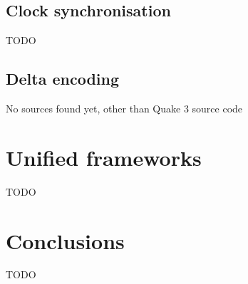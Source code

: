 \documentclass[conference]{IEEEtran}
\begin{document}
	\subsection{Clock synchronisation}

	TODO \cite{cristian1989probabilistic}

	\subsection{Delta encoding}

	No sources found yet, other than Quake 3 source code

	\section{Unified frameworks}

	TODO \cite{savery2013timelines} \cite{touch1992mirage} \cite{diot1999distributed}

	\section{Conclusions}

	TODO

	\printbibliography
\end{document}
